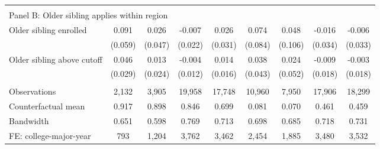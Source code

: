 {{\begin{tabular}{lcccccccc}
&  &  &  & & & & & &    \\
\multicolumn{9}{l}{Panel B: Older sibling applies within region} \\
Older sibling enrolled&       0.091   &       0.026   &      -0.007   &       0.026   &       0.074   &       0.048   &      -0.016   &      -0.006   \\
                    &     (0.059)   &     (0.047)   &     (0.022)   &     (0.031)   &     (0.084)   &     (0.106)   &     (0.034)   &     (0.033)   \\
 
Older sibling above cutoff&       0.046   &       0.013   &      -0.004   &       0.014   &       0.038   &       0.024   &      -0.009   &      -0.003   \\
                    &     (0.029)   &     (0.024)   &     (0.012)   &     (0.016)   &     (0.043)   &     (0.052)   &     (0.018)   &     (0.018)   \\
                    &               &               &               &               &               &               &               &               \\
Observations        &       2,132   &       3,905   &      19,958   &      17,748   &      10,960   &       7,950   &      17,906   &      18,299   \\
Counterfactual mean &       0.917   &       0.898   &       0.846   &       0.699   &       0.081   &       0.070   &       0.461   &       0.459   \\
Bandwidth           &       0.651   &       0.598   &       0.769   &       0.713   &       0.698   &       0.685   &       0.718   &       0.731   \\
FE: college-major-year&         793   &       1,204   &       3,762   &       3,462   &       2,454   &       1,885   &       3,480   &       3,532   \\
 

\bottomrule
\end{tabular}
}
}
